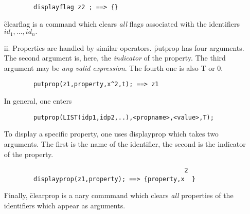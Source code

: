 \begin{itemize}
\begin{verbatim}
        displayflag z2 ; ==> {}
\end{verbatim}
\f{clearflag} is a command which clears \emph{all} flags associated with
the identifiers $id_1, \ldots , id_n .$
\item[ii.] Properties are handled by similar operators.
\hypertarget{operator:PUTPROP}{}
\f{putprop} has four arguments. The second argument is, here, the
\emph{indicator} of the property. The third argument may be \emph{any
valid expression}. The fourth one is also T or 0.
\begin{verbatim}
        putprop(z1,property,x^2,t); ==> z1
\end{verbatim}
In general, one enters
\begin{verbatim}
        putprop(LIST(idp1,idp2,..),<propname>,<value>,T);
\end{verbatim}
\hypertarget{operator:DISPLAYPROP}{}
To display a specific property, one uses
\f{displayprop} which takes two arguments. The first is the name of the
identifier, the second is the indicator of the property.
\begin{verbatim}
                                                 2
        displayprop(z1,property); ==> {property,x  }
\end{verbatim}
\hypertarget{operator:CLEARPROP}{}
Finally, \f{clearprop} is a nary commmand which clears \emph{all}
properties of the identifiers which appear as arguments.
\end{itemize}
